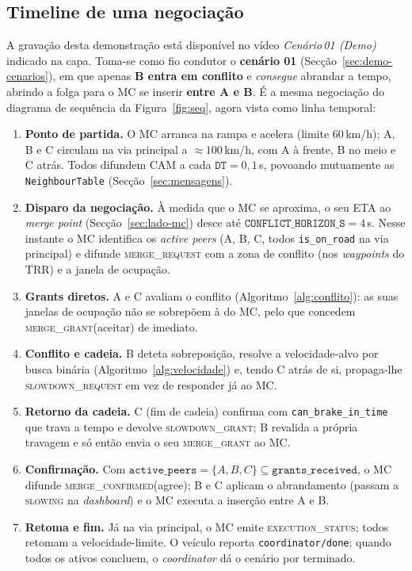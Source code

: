 \documentclass[11pt,a4paper]{article}
\begin{document}
\subsection{Timeline de uma negociação}
\label{sec:demo-timeline}

A gravação desta demonstração está disponível no vídeo \emph{Cenário\,01 (Demo)}
indicado na capa. Toma-se como fio condutor o \textbf{cenário 01}
(Secção~\ref{sec:demo-cenarios}), em que apenas \textbf{B entra em conflito} e
\emph{consegue} abrandar a tempo, abrindo a folga para o MC se inserir \textbf{entre A
e B}. É a mesma negociação do diagrama de sequência da Figura~\ref{fig:seq}, agora
vista como linha temporal:

\begin{enumerate}[noitemsep,topsep=2pt,label=\textbf{t\arabic*.}]
  \item \textbf{Ponto de partida.} O MC arranca na rampa e acelera (limite
        $60$\,km/h); A, B e C circulam na via principal a $\approx100$\,km/h, com A à
        frente, B no meio e C atrás. Todos difundem CAM a cada $\texttt{DT}=0{,}1$\,s,
        povoando mutuamente as \texttt{NeighbourTable} (Secção~\ref{sec:mensagens}).
  \item \textbf{Disparo da negociação.} À medida que o MC se aproxima, o seu ETA ao
        \emph{merge point} (Secção~\ref{sec:lado-mc}) desce até
        $\texttt{CONFLICT\_HORIZON\_S}=4$\,s. Nesse instante o MC identifica os
        \emph{active peers} (A, B, C, todos \texttt{is\_on\_road} na via principal) e
        difunde \textsc{merge\_request} com a zona de conflito (nos \emph{waypoints}
        do TRR) e a janela de ocupação.
  \item \textbf{Grants diretos.} A e C avaliam o conflito
        (Algoritmo~\ref{alg:conflito}): as suas janelas de ocupação não se sobrepõem
        à do MC, pelo que concedem \textsc{merge\_grant}(aceitar) de imediato.
  \item \textbf{Conflito e cadeia.} B deteta sobreposição, resolve a velocidade-alvo
        por busca binária (Algoritmo~\ref{alg:velocidade}) e, tendo C atrás de si,
        propaga-lhe \textsc{slowdown\_request} em vez de responder já ao MC.
  \item \textbf{Retorno da cadeia.} C (fim de cadeia) confirma com
        \texttt{can\_brake\_in\_time} que trava a tempo e devolve
        \textsc{slowdown\_grant}; B revalida a própria travagem e só então envia o seu
        \textsc{merge\_grant} ao MC.
  \item \textbf{Confirmação.} Com $\texttt{active\_peers}=\{A,B,C\}\subseteq
        \texttt{grants\_received}$, o MC difunde \textsc{merge\_confirmed}(agree); B e
        C aplicam o abrandamento (passam a \textsc{slowing} na \emph{dashboard}) e o MC
        executa a inserção entre A e B.
  \item \textbf{Retoma e fim.} Já na via principal, o MC emite
        \textsc{execution\_status}; todos retomam a velocidade-limite. O veículo
        reporta \texttt{coordinator/done}; quando todos os ativos concluem, o
        \emph{coordinator} dá o cenário por terminado.
\end{enumerate}
\end{document}
